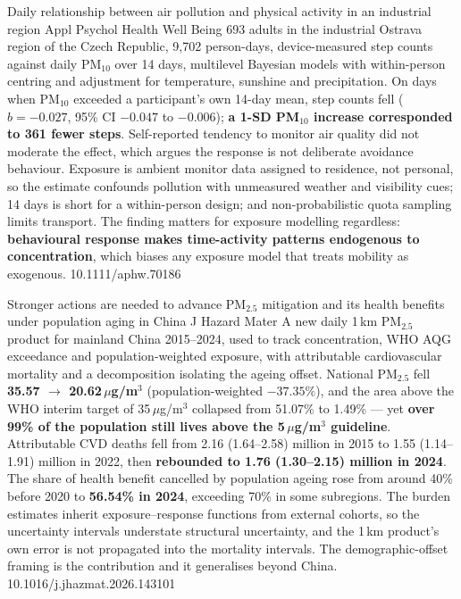 \documentclass[10pt]{article}
\begin{document}
{Daily relationship between air pollution and physical activity in an industrial region}
{Appl Psychol Health Well Being}
{693 adults in the industrial Ostrava region of the Czech Republic, 9,702 person-days,
device-measured step counts against daily PM$_{10}$ over 14 days, multilevel Bayesian
models with within-person centring and adjustment for temperature, sunshine and
precipitation. On days when PM$_{10}$ exceeded a participant's own 14-day mean, step
counts fell ($b = -0.027$, 95\% CI $-0.047$ to $-0.006$); \textbf{a 1-SD PM$_{10}$
increase corresponded to 361 fewer steps}. Self-reported tendency to monitor air quality
did not moderate the effect, which argues the response is not deliberate avoidance
behaviour. Exposure is ambient monitor data assigned to residence, not personal, so the
estimate confounds pollution with unmeasured weather and visibility cues; 14 days is
short for a within-person design; and non-probabilistic quota sampling limits transport.
The finding matters for exposure modelling regardless: \textbf{behavioural response makes
time-activity patterns endogenous to concentration}, which biases any exposure model that
treats mobility as exogenous.}
{10.1111/aphw.70186}


{Stronger actions are needed to advance PM$_{2.5}$ mitigation and its health benefits
under population aging in China}
{J Hazard Mater}
{A new daily 1\,km PM$_{2.5}$ product for mainland China 2015--2024, used to track
concentration, WHO AQG exceedance and population-weighted exposure, with attributable
cardiovascular mortality and a decomposition isolating the ageing offset. National
PM$_{2.5}$ fell \textbf{35.57 $\rightarrow$ 20.62\,$\mu$g/m$^3$} (population-weighted
$-37.35\%$), and the area above the WHO interim target of 35\,$\mu$g/m$^3$ collapsed from
51.07\% to 1.49\% --- yet \textbf{over 99\% of the population still lives above the
5\,$\mu$g/m$^3$ guideline}. Attributable CVD deaths fell from 2.16 (1.64--2.58) million
in 2015 to 1.55 (1.14--1.91) million in 2022, then \textbf{rebounded to 1.76 (1.30--2.15)
million in 2024}. The share of health benefit cancelled by population ageing rose from
around 40\% before 2020 to \textbf{56.54\% in 2024}, exceeding 70\% in some subregions.
The burden estimates inherit exposure--response functions from external cohorts, so the
uncertainty intervals understate structural uncertainty, and the 1\,km product's own
error is not propagated into the mortality intervals. The demographic-offset framing is
the contribution and it generalises beyond China.}
{10.1016/j.jhazmat.2026.143101}
\end{document}
